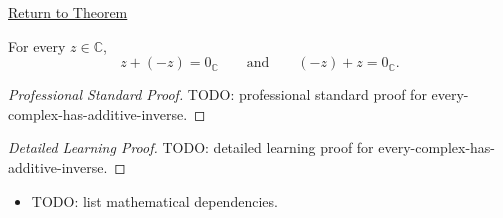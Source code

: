 \newpage
{}
\label{prf:every-complex-has-additive-inverse}

\begin{remark*}[Return]
\hyperref[thm:every-complex-has-additive-inverse]{Return to Theorem}
\end{remark*}

\begin{theorem*}
For every \(z\in\mathbb{C}\),
\[
z+(-z)=0_{\mathbb{C}}
\qquad\text{and}\qquad
(-z)+z=0_{\mathbb{C}}.
\]
\end{theorem*}

\begin{proof}[Professional Standard Proof]
\LRAProofBodyStart
TODO: professional standard proof for every-complex-has-additive-inverse.
\end{proof}

\begin{proof}[Detailed Learning Proof]
\LRAProofBodyStart
TODO: detailed learning proof for every-complex-has-additive-inverse.
\end{proof}

\begin{remark*}
\end{remark*}

\begin{dependencies}
\begin{itemize}
  \item TODO: list mathematical dependencies.
\end{itemize}
\end{dependencies}

\clearpage
